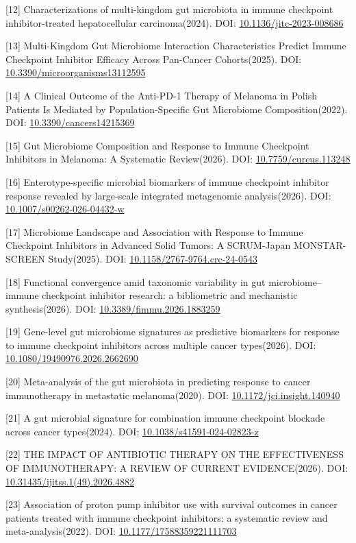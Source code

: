 {[}12{]} Characterizations of multi-kingdom gut microbiota in immune checkpoint inhibitor-treated hepatocellular carcinoma(2024). DOI: \url{10.1136/jitc-2023-008686}

{[}13{]} Multi-Kingdom Gut Microbiome Interaction Characteristics Predict Immune Checkpoint Inhibitor Efficacy Across Pan-Cancer Cohorts(2025). DOI: \url{10.3390/microorganisms13112595}

{[}14{]} A Clinical Outcome of the Anti-PD-1 Therapy of Melanoma in Polish Patients Is Mediated by Population-Specific Gut Microbiome Composition(2022). DOI: \url{10.3390/cancers14215369}

{[}15{]} Gut Microbiome Composition and Response to Immune Checkpoint Inhibitors in Melanoma: A Systematic Review(2026). DOI: \url{10.7759/cureus.113248}

{[}16{]} Enterotype-specific microbial biomarkers of immune checkpoint inhibitor response revealed by large-scale integrated metagenomic analysis(2026). DOI: \url{10.1007/s00262-026-04432-w}

{[}17{]} Microbiome Landscape and Association with Response to Immune Checkpoint Inhibitors in Advanced Solid Tumors: A SCRUM-Japan MONSTAR-SCREEN Study(2025). DOI: \url{10.1158/2767-9764.crc-24-0543}

{[}18{]} Functional convergence amid taxonomic variability in gut microbiome--immune checkpoint inhibitor research: a bibliometric and mechanistic synthesis(2026). DOI: \url{10.3389/fimmu.2026.1883259}

{[}19{]} Gene-level gut microbiome signatures as predictive biomarkers for response to immune checkpoint inhibitors across multiple cancer types(2026). DOI: \url{10.1080/19490976.2026.2662690}

{[}20{]} Meta-analysis of the gut microbiota in predicting response to cancer immunotherapy in metastatic melanoma(2020). DOI: \url{10.1172/jci.insight.140940}

{[}21{]} A gut microbial signature for combination immune checkpoint blockade across cancer types(2024). DOI: \url{10.1038/s41591-024-02823-z}

{[}22{]} THE IMPACT OF ANTIBIOTIC THERAPY ON THE EFFECTIVENESS OF IMMUNOTHERAPY: A REVIEW OF CURRENT EVIDENCE(2026). DOI: \url{10.31435/ijitss.1(49).2026.4882}

{[}23{]} Association of proton pump inhibitor use with survival outcomes in cancer patients treated with immune checkpoint inhibitors: a systematic review and meta-analysis(2022). DOI: \url{10.1177/17588359221111703}

